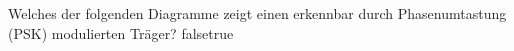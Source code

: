     {Welches der folgenden Diagramme zeigt einen erkennbar durch Phasenumtastung (PSK) modulierten Träger?}
    {}
    {}
    {}
    {}
    {false}{true}